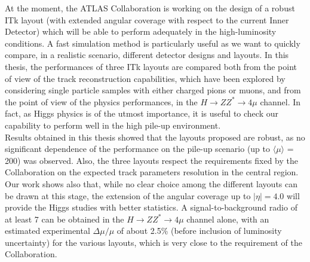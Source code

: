 \documentclass[paper=a4, fontsize=11pt]{scrartcl}	%
\numberwithin{equation}{section}		%
\numberwithin{figure}{section}			%
\numberwithin{table}{section}				%
\begin{document}
At the moment, the ATLAS Collaboration is working on the design of a robust ITk layout (with extended angular coverage with respect to the current Inner Detector) 
 which will be able to perform adequately in the high-luminosity conditions. A fast simulation method is particularly useful as we want to quickly compare, in a realistic scenario, different detector designs and layouts. In this thesis, the performances of three ITk layouts are compared both from the point of view of the track reconstruction capabilities, which have been explored by considering single particle samples with either charged pions or muons, and 
from the point of view of the physics performances, in the $H \rightarrow ZZ^{*} \rightarrow 4\mu$ channel. In fact, 
 as Higgs physics is of the utmost importance, it is useful to check our capability to perform
 well in the high pile-up environment. \\
 
Results obtained in this thesis showed that the layouts proposed 
are robust, as no significant dependence of the performance on the pile-up scenario (up to $\langle\mu\rangle$ = 200) was observed. Also, the three layouts respect the requirements fixed by the Collaboration on the expected track parameters resolution in the central
region. Our work shows also that, while no clear choice among the different layouts can be drawn at this stage, the extension of the angular coverage up to $|\eta| = 4.0$ will provide the Higgs studies with better statistics. A signal-to-background radio of at least 7 can be obtained in the $H \rightarrow ZZ^{*} \rightarrow 4\mu$ channel alone, with an estimated experimental $\Delta\mu/\mu$ of about 2.5\%  (before inclusion of luminosity uncertainty) for the various layouts, which is very close to the requirement of the Collaboration. 
\end{document}

